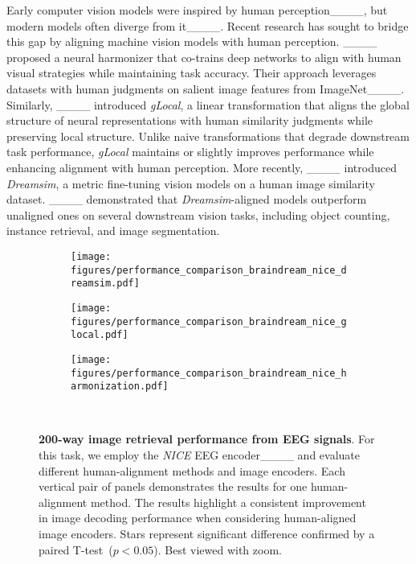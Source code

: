 Early computer vision models were inspired by human perception____, but modern models often diverge from it____. Recent research has sought to bridge this gap by aligning machine vision models with human perception. ____ proposed a neural harmonizer that co-trains deep networks to align with human visual strategies while maintaining task accuracy. Their approach leverages datasets with human judgments on salient image features from ImageNet____. Similarly, ____ introduced \emph{gLocal}, a linear transformation that aligns the global structure of neural representations with human similarity judgments while preserving local structure. Unlike naive transformations that degrade downstream task performance, \emph{gLocal} maintains or slightly improves performance while enhancing alignment with human perception. More recently, ____ introduced \emph{Dreamsim}, a metric fine-tuning vision models on a human image similarity dataset. ____ demonstrated that \emph{Dreamsim}-aligned models outperform unaligned ones on several downstream vision tasks, including object counting, instance retrieval, and image segmentation.

\begin{figure*}[ht]
    \centering
    \begin{subfigure}[b]{0.36\textwidth}
        \centering
        \texttt{[image: figures/performance\_comparison\_braindream\_nice\_dreamsim.pdf]}
        \caption{}
        \label{fig:dreamsim}
    \end{subfigure}
    \begin{subfigure}[b]{0.36\textwidth}
        \centering
        \texttt{[image: figures/performance\_comparison\_braindream\_nice\_glocal.pdf]}
        \caption{}
        \label{fig:glocal}
    \end{subfigure}
    \begin{subfigure}[b]{0.25\textwidth}
        \centering
        \texttt{[image: figures/performance\_comparison\_braindream\_nice\_harmonization.pdf]}
        \vspace{0.5pt}
        \caption{}
        \label{fig:harmonization}
    \end{subfigure}\\
    \caption{\textbf{200-way image retrieval performance from EEG signals}. For this task, we employ the \emph{NICE} EEG encoder____ and evaluate different human-alignment methods and image encoders. Each vertical pair of panels demonstrates the results for one human-alignment method. The results highlight a consistent improvement in image decoding performance when considering human-aligned image encoders. Stars represent significant difference confirmed by a paired T-test~($p<0.05$). Best viewed with zoom.}
    \label{fig:alignment_methods}
    \vspace{-2ex}
\end{figure*}